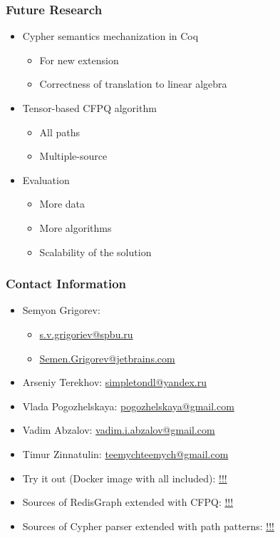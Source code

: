 \documentclass[xcolor=table,aspectratio=169]{beamer}
\begin{document}
\begin{frame}[fragile] \frametitle{Future Research}
  \begin{itemize}
    \item Cypher semantics mechanization in Coq
    \begin{itemize}
      \item For new extension
      \item Correctness of translation to linear algebra
    \end{itemize}
    \item Tensor-based CFPQ algorithm
    \begin{itemize}
      \item All paths
      \item Multiple-source
    \end{itemize}
    \item Evaluation
    \begin{itemize}
      \item More data
      \item More algorithms
      \item Scalability of the solution
    \end{itemize}
  \end{itemize}
\end{frame}

\begin{frame}
\frametitle{Contact Information}
\begin{itemize}
  \item Semyon Grigorev:
    \begin{itemize}
      \item \href{mailto:s.v.grigoriev@spbu.ru}{s.v.grigoriev@spbu.ru}
      \item \href{mailto:Semen.Grigorev@jetbrains.com}{Semen.Grigorev@jetbrains.com}
    \end{itemize}

  \item Arseniy Terekhov: \href{mailto:simpletondl@yandex.ru}{simpletondl@yandex.ru}
  \item Vlada Pogozhelskaya: \href{mailto:pogozhelskaya@gmail.com}{pogozhelskaya@gmail.com}
  \item Vadim Abzalov: \href{mailto:vadim.i.abzalov@gmail.com}{vadim.i.abzalov@gmail.com}
  \item Timur Zinnatulin: \href{mailto:teemychteemych@gmail.com}{teemychteemych@gmail.com}

  \vspace{0.5cm}
  \item Try it out (Docker image with all included): \url{!!!}
  \item Sources of RedisGraph extended with CFPQ: \url{!!!}
  \item Sources of Cypher parser extended with path patterns: \url{!!!}
\end{itemize}
\vspace{0.1cm}
\end{frame}
\end{document}
